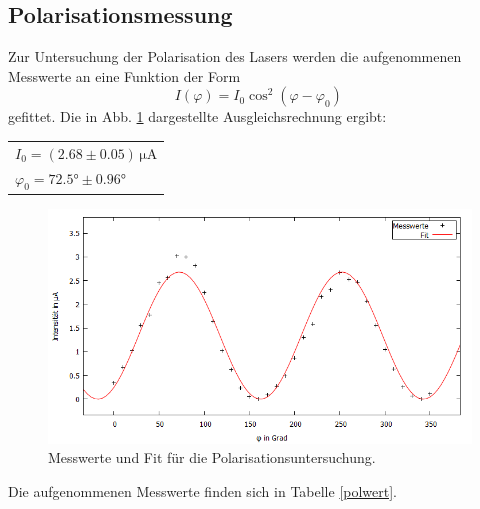 \subsection{Polarisationsmessung}
Zur Untersuchung der Polarisation des Lasers werden die aufgenommenen Messwerte an eine Funktion der Form
\begin{equation}
   I(\varphi) = I_0 \cos^2\!\left(\varphi-\varphi_0\right)\,
\end{equation}
gefittet. Die in Abb. \ref{polfit} dargestellte Ausgleichsrechnung ergibt:
\begin{table}[H]
  \centering
\begin{tabular}{l}
 $I_0=(2.68 \pm 0.05)\, \si{\micro\ampere}$\\
 $\varphi_0=72.5° \pm 0.96°$   \\
\end{tabular}
\end{table}
\begin{figure}[H]
  \centering
  \includegraphics[width=14cm]{bilder/polarplot.png}
  \caption{Messwerte und Fit für die Polarisationsuntersuchung.}
  \label{polfit}
\end{figure}
Die aufgenommenen Messwerte finden sich in Tabelle \ref{polwert}.
